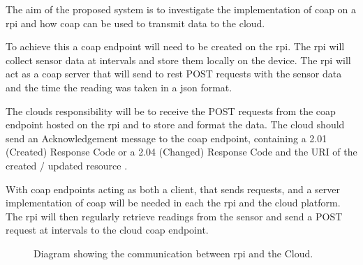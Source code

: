 The aim of the proposed system is to investigate the implementation of \gls{coap} 
on a \gls{rpi} and how \gls{coap} can be used to transmit data to the cloud. 

To achieve this a \gls{coap} endpoint will need to be created on the \gls{rpi}. 
The \gls{rpi} will collect sensor data at intervals and store them 
locally on the device. The \gls{rpi} will act as a \gls{coap} server that will 
send to \gls{rest} POST requests with the sensor data and the time
the reading was taken in a \gls{json} format.

The clouds responsibility will be to receive the POST requests from the \gls{coap} 
endpoint hosted on the \gls{rpi} and to store and format the data. 
The cloud should send an Acknowledgement message to the \gls{coap} endpoint, 
containing a 2.01 (Created) Response Code or a 2.04 (Changed) Response Code 
and the URI of the created / updated resource \citep{shelby_constrained_2014}. 

With \gls{coap} endpoints acting as both a client, that sends requests, and a 
server implementation of \gls{coap} will be needed 
in each the \gls{rpi} and the cloud platform. The \gls{rpi} will then regularly 
retrieve readings from the sensor and send a POST request 
at intervals to the cloud \gls{coap} endpoint. 

\begin{figure}[H]
    \centering
    \caption{\label{fig:rpi_cloud_comms} Diagram showing the communication between \gls{rpi} and the Cloud.}
\end{figure}